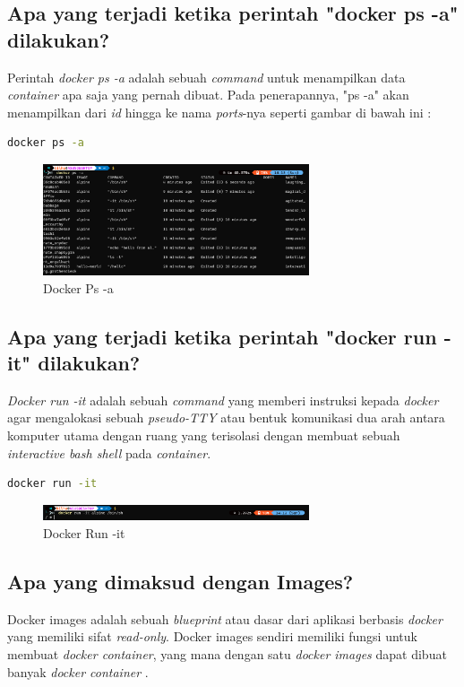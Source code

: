 \documentclass[11pt,a4paper]{article}
\begin{document}
\subsection{Apa yang terjadi ketika perintah "docker ps -a" dilakukan?}
    Perintah \textit{docker ps -a} adalah sebuah \textit{command} untuk menampilkan data \textit{container} apa saja yang pernah dibuat. Pada penerapannya, 
    "ps -a" akan menampilkan dari \textit{id} hingga ke nama \textit{ports}-nya seperti gambar di bawah ini : 
    \begin{lstlisting}[language=bash]
        docker ps -a
    \end{lstlisting}
    
    \begin{figure}[h]
        \centering
        \includegraphics[width = 0.7\textwidth]{Figures/docker ps-a.png}
        \caption{Docker Ps -a}
    \end{figure}


\subsection{Apa yang terjadi ketika perintah "docker run -it" dilakukan?}
    \textit{Docker run -it} adalah sebuah \textit{command} yang memberi instruksi kepada \textit{docker} agar mengalokasi sebuah
    \textit{pseudo-TTY} atau bentuk komunikasi dua arah antara komputer utama dengan ruang yang terisolasi dengan
    membuat sebuah \textit{interactive bash shell} pada \textit{container}. 
    \begin{lstlisting}[language=bash]
        docker run -it
    \end{lstlisting}

    \begin{figure}[h]
        \centering
        \includegraphics[width = 0.7\textwidth]{Figures/bin-sh.png}
        \caption{Docker Run -it}
    \end{figure}

\subsection{Apa yang dimaksud dengan Images?}
Docker images adalah sebuah \textit{blueprint} atau dasar dari aplikasi berbasis \textit{docker} yang memiliki sifat \textit{read-only}. Docker images sendiri 
memiliki fungsi untuk membuat \textit{docker container}, yang mana dengan satu \textit{docker images} dapat dibuat banyak \textit{docker container} \cite{hanif_2017}.
\end{document}
